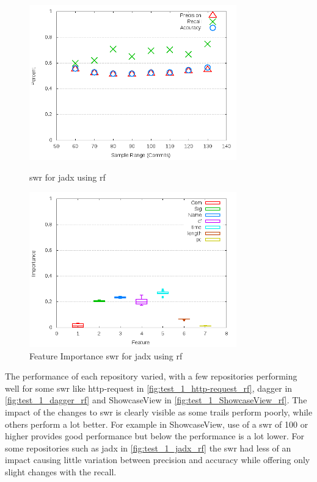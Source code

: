 \begin{figure}[!ht]
    \centering
        \includegraphics[width=0.8\textwidth]{images/rf/test_1/jadx_sample_range}
    \caption{\gls{swr} for jadx using \gls{rf}}
    \label{fig:test_1_jadx_rf}

    \includegraphics[width=0.8\textwidth]{images/rf/test_1/jadx_importance}
        \caption{Feature Importance \gls{swr} for jadx using \gls{rf}}
        \label{fig:test_1_jadx_rf_importance}
\end{figure}

The performance of each repository varied, with a few repositories performing well for some \gls{swr} like http-request in \autoref{fig:test_1_http-request_rf}, dagger in \autoref{fig:test_1_dagger_rf} and ShowcaseView in \autoref{fig:test_1_ShowcaseView_rf}. The impact of the changes to \gls{swr} is clearly visible as some trails perform poorly, while others perform a lot better. For example in ShowcaseView, use of a \gls{swr} of 100 or higher provides good performance but below the performance is a lot lower. For some repositories such as jadx in \autoref{fig:test_1_jadx_rf} the \gls{swr} had less of an impact causing little variation between precision and accuracy while offering only slight changes with the recall.

